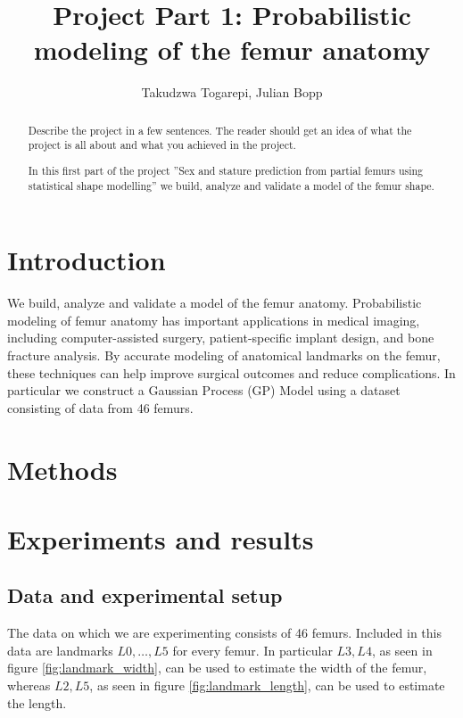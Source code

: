 \documentclass[10pt]{article}
\author{Takudzwa Togarepi, Julian Bopp }
\title{Project Part 1: Probabilistic modeling of the femur anatomy}
\begin{document}
\maketitle
\begin{abstract}
    Describe the project in a few sentences. 
    The reader should get an idea of what the project is all about
    and what you achieved in the project.


    In this first part of the project ''Sex and stature prediction from partial femurs using statistical shape modelling'' we build,
    analyze and validate a model of the femur shape.
\end{abstract}

\section{Introduction}

We build, analyze and validate a model of the femur anatomy. Probabilistic modeling of femur anatomy has important applications in medical imaging, including computer-assisted surgery, patient-specific implant design, and bone fracture analysis. By accurate modeling of anatomical landmarks on the femur, these techniques can help improve surgical outcomes and reduce complications. In particular we construct a Gaussian Process (GP) Model using a dataset consisting of data from 46 femurs.
\section{Methods}


\newpage
\section{Experiments and results}
\subsection{Data and experimental setup}


The data on which we are experimenting consists of 46 femurs. Included in this data are landmarks $L0,\dots,L5$ for every femur.
In particular $L3,L4$, as seen in figure \ref{fig:landmark_width}, can be used to estimate the width of the femur, whereas $L2,L5$, as seen in figure \ref{fig:landmark_length}, can be used to estimate the length.
\end{document}
